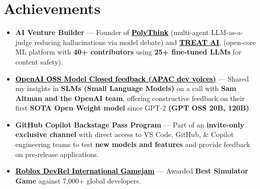 \documentclass[letterpaper,10.8pt]{article}
\let\oldhref\href
\renewcommand{\href}[2]{\oldhref{#1}{\textcolor{linkgrey}{\uline{\textcolor{black}{#2}}}}}
\newcommand{\resumeSubHeadingListStart}{\begin{itemize}[leftmargin=*]}
\newcommand{\resumeSubHeadingListEnd}{\end{itemize}}
\begin{document}
\section*{Achievements}
\resumeSubHeadingListStart

\item\textbf{AI Venture Builder} — Founder of \textbf{\href{https://www.polyth.ink/}{PolyThink}} (multi-agent LLM-as-a-judge reducing hallucinations via model debate) and \textbf{\href{https://trytreat.tech/}{TREAT AI}}, (open-core ML platform with \textbf{40+ contributors} using \textbf{25+ fine-tuned LLMs} for content safety).

\item\textbf{\href{https://www.linkedin.com/feed/update/urn:li:activity:7322867944181399552/}{OpenAI OSS Model Closed feedback (APAC dev voices)}} — Shared my insights in \textbf{SLMs (Small Language Models)} on a call with \textbf{Sam Altman and the OpenAI team}, offering constructive feedback on their first \textbf{SOTA Open Weight model} since GPT-2 \textbf{(GPT OSS 20B, 120B)}.

\item \textbf{GitHub Copilot Backstage Pass Program} — Part of an \textbf{invite-only exclusive channel} with direct access to VS Code, GitHub, \& Copilot engineering teams to test \textbf{new models and features} and provide feedback on pre-release applications.

\item \textbf{\href{https://media.licdn.com/dms/image/v2/D562DAQG7PINx-24MPA/profile-treasury-image-shrink_800_800/profile-treasury-image-shrink_800_800/0/1723232806730?e=1741608000\&v=beta\&t=UIry8g7Tyj4Lo9cnannvYgDn-ZYgYkDLdvKInLc7XVU}{Roblox DevRel International Gamejam}} — Awarded \textbf{Best Simulator Game} against 7,000+ global developers.

\resumeSubHeadingListEnd
\end{document}
